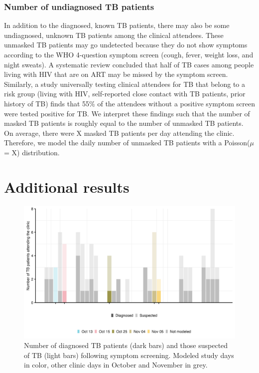 \documentclass[fleqn,11pt]{wlscirep_supp}
\begin{document}
\subsubsection{Number of undiagnosed TB patients}


In addition to the diagnosed, known TB patients, there may also be some undiagnosed, unknown TB patients among the clinical attendees. These unmasked TB patients may go undetected because they do not show symptoms according to the WHO 4-question symptom screen (cough, fever, weight loss, and night sweats). A systematic review concluded that half of TB cases among people living with HIV that are on ART may be missed by the symptom screen\cite{Hamada2018LancetHIV}. Similarly, a study universally testing clinical attendees for TB that belong to a risk group (living with HIV, self-reported close contact with TB patients, prior history of TB) finds that 55\% of the attendees without a positive symptom screen were tested positive for TB\cite{Berhanu2023CID}. We interpret these findings such that the number of masked TB patients is roughly equal to the number of unmasked TB patients. On average, there were X masked TB patients per day attending the clinic. Therefore, we model the daily number of unmasked TB patients with a Poisson($\mu$ = X) distribution. 


\clearpage

\section{Additional results}\label{sec:additional-results}

\begin{figure}[!htpb]
    \centering
    \includegraphics{results/data/diagnosed-tb-patients.png}
    \caption{Number of diagnosed TB patients (dark bars) and those suspected of TB (light bars) following symptom screening. Modeled study days in color, other clinic days in October and November in grey.}
    \label{fig:diagnosed-tb-patients}
\end{figure}
\end{document}
